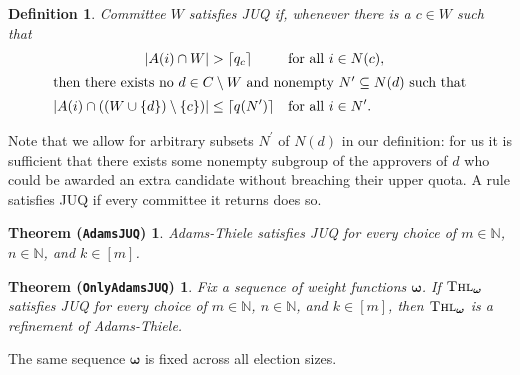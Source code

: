 \documentclass[11pt,a4paper]{article}
\newcommand{\voters}{N}
\newcommand{\candidates}{C}
\newcommand{\app}[1]{A(#1)}
\newcommand{\committee}{W}
\newcommand{\weight}{\omega}
\newcommand{\nats}{\mathbb N}
\newcommand{\Thiele}{\textnormal{\textsc{Thl}}}
\newcommand{\quota}{q}
\newcommand{\Adams}{\textnormal{Adams-Thiele}}
\newcommand{\ceil}[1]{\left\lceil#1\right\rceil}
\newtheorem{definition}{Definition}
\newtheorem*{adamsjuq}{Theorem (\texttt{AdamsJUQ})}
\newtheorem*{onlyadamsjuq}{Theorem (\texttt{OnlyAdamsJUQ})}
\begin{document}
\begin{definition}\label{def:JUQ}
	Committee $\committee$ satisfies \emph{JUQ} if,
  whenever there is a $c\in \committee$ such that
  \begin{align*}
    \lvert\app{i}\cap\committee\rvert
    &> \ceil{\quota_c}
    &&\text{for all } i\in\voters(c), \\
    \intertext{then there exists no $d\in \candidates\setminus \committee$
    and nonempty $\voters^\prime\subseteq\voters(d)$ such that}
    \lvert\app{i}\cap((\committee\cup\{d\})\setminus\{c\})\rvert
    &\le \ceil{\quota(\voters^\prime)}
    &&\text{for all } i\in\voters^\prime.
  \end{align*}
\end{definition}
Note that we allow for arbitrary subsets $\voters^\prime$ of $\voters(d)$ in
our definition: for us it is sufficient that there exists some nonempty
subgroup of the approvers of $d$ who could be awarded an extra candidate without
breaching their upper quota. A rule satisfies JUQ if every committee it returns
does so.

\begin{adamsjuq}
	\Adams{} satisfies JUQ for every choice of $m\in\nats$, $n\in\nats$, and $k\in[m]$.
\end{adamsjuq}

\begin{onlyadamsjuq}
Fix a sequence of weight functions
$\boldsymbol{\weight}$. If $\Thiele_{\boldsymbol{\weight}}$ satisfies JUQ
for every choice of $m\in\nats$, $n\in\nats$, and $k\in[m]$, then
$\Thiele_{\boldsymbol{\weight}}$ is a refinement of \Adams.
\end{onlyadamsjuq}

The same sequence $\boldsymbol{\weight}$ is fixed across all election sizes.



\end{document}
